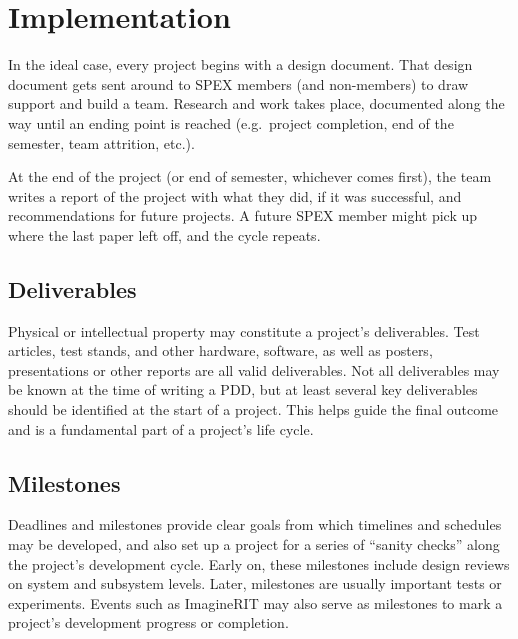 \documentclass[conference]{IEEEtran} %
\begin{document}
\section{Implementation}
\label{sec:implementation}

In the ideal case, every project begins with a design document.
That design document gets sent around to SPEX members (and non-members) to draw support and build a team.
Research and work takes place, documented along the way until  an ending point is reached (e.g.\ project completion, end of the semester, team attrition, etc.).

At the end of the project (or end of semester, whichever comes first), the team writes a report of the project with what they did, if it was successful, and recommendations for future projects.
A future SPEX member might pick up where the last paper left off, and the cycle repeats.

\subsection{Deliverables}
\label{subsec:deliverables}
Physical or intellectual property may constitute a project's deliverables.
Test articles, test stands, and other hardware, software, as well as posters, presentations or other reports are all valid deliverables.
Not all deliverables may be known at the time of writing a PDD, but at least several key deliverables should be identified at the start of a project.
This helps guide the final outcome and is a fundamental part of a project's life cycle.

\subsection{Milestones}
\label{subsec:milestones}
Deadlines and milestones provide clear goals from which timelines and schedules may be developed, and also set up a project for a series of ``sanity checks'' along the project's development cycle.
Early on, these milestones include design reviews on system and subsystem levels.
Later, milestones are usually important tests or experiments.
Events such as ImagineRIT may also serve as milestones to mark a project's development progress or completion.
\end{document}
